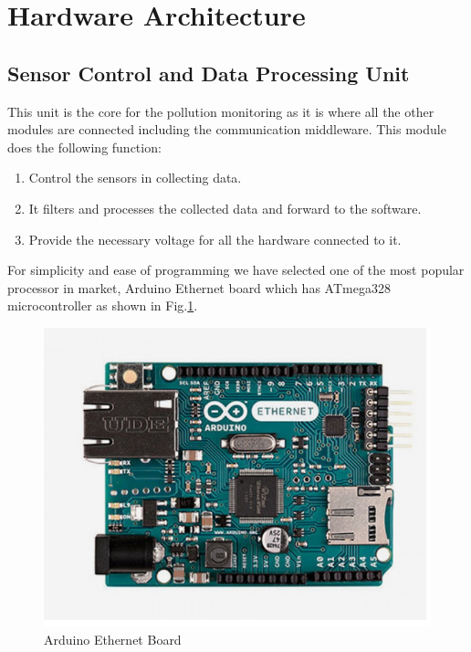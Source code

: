  \section{Hardware Architecture}
  
 \subsection{Sensor Control and Data Processing Unit}
This unit is the core for the pollution monitoring as it is where all the other modules are connected including the communication middleware. This module does the following function:


\begin{enumerate}

\item Control the sensors in collecting data.
\item It filters and processes the collected data and forward to the software.
\item Provide the necessary voltage for all the hardware connected to it.

\end{enumerate}
For simplicity and ease of programming we have selected one of the most popular processor in market, Arduino Ethernet board which has ATmega328 microcontroller as shown in Fig.\ref{Arduino}. 

\begin{figure}[h]
  \begin{center}
  \includegraphics[scale=0.80]{./images/figure3.png}
  \end{center}
  \caption{Arduino Ethernet Board}
  \label{Arduino}
\end{figure}

